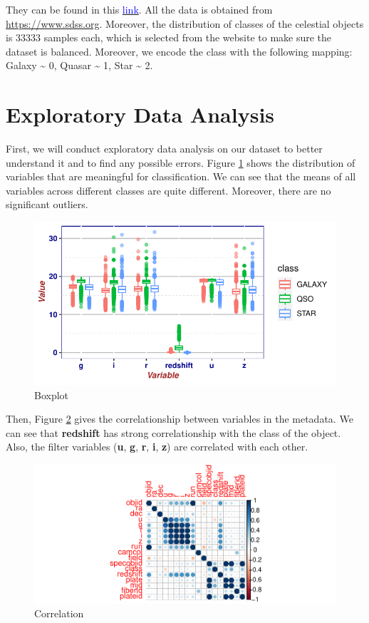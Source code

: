 \documentclass[
  11pt,
]{article}
\begin{document}
They can be found in this \href{https://github.com/siriuszza/stat679final/tree/main/data}{\textcolor{blue}{link}}. All the data is obtained from \url{https://www.sdss.org}. Moreover, the distribution of classes of the celestial objects is 33333 samples each, which is selected from the website to make sure the dataset is balanced. Moreover, we encode the class with the following mapping: Galaxy \textasciitilde{} 0, Quasar \textasciitilde{} 1, Star \textasciitilde{} 2.

\hypertarget{exploratory-data-analysis}{%
\section{Exploratory Data Analysis}\label{exploratory-data-analysis}}

First, we will conduct exploratory data analysis on our dataset to better understand it and to find any possible errors. Figure \ref{fig:boxplot} shows the distribution of variables that are meaningful for classification. We can see that the means of all variables across different classes are quite different. Moreover, there are no significant outliers.

\begin{figure}
\centering
\includegraphics{final_report_files/figure-latex/boxplot-1.pdf}
\caption{\label{fig:boxplot}Boxplot}
\end{figure}

Then, Figure \ref{fig:corr} gives the correlationship between variables in the metadata. We can see that \textbf{redshift} has strong correlationship with the class of the object. Also, the filter variables (\textbf{u}, \textbf{g}, \textbf{r}, \textbf{i}, \textbf{z}) are correlated with each other.

\begin{figure}
\centering
\includegraphics{final_report_files/figure-latex/corr-1.pdf}
\caption{\label{fig:corr}Correlation}
\end{figure}
\end{document}
